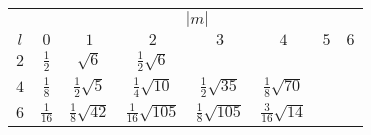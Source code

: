 \begin{table}[h] \renewcommand{\arraystretch}{1.3}
  \begin{center}
    \begin{tabular}{c|ccccccc}
          & \multicolumn{7}{|c}{$|m|$} \\  \cline{2-8}
      $l$ & $0$ & $1$ & $2$ & $3$ & $4$ & $5$ & $6$ \\
      \hline \hline
      $2$ & $\frac{1}{2}$  & $\sqrt{6}$             & $\frac{1}{2}\sqrt{6}$  & & & & \\
      $4$ & $\frac{1}{8}$  & $\frac{1}{2}\sqrt{5}$  & $\frac{1}{4}\sqrt{10}$   & $\frac{1}{2}\sqrt{35}$ & $\frac{1}{8}\sqrt{70}$   & & \\
      $6$ & $\frac{1}{16}$ & $\frac{1}{8}\sqrt{42}$ & $\frac{1}{16}\sqrt{105}$ & $\frac{1}{8}\sqrt{105}$ & $\frac{3}{16}\sqrt{14}$ &

\end{tabular}
\end{center}
\end{table}
